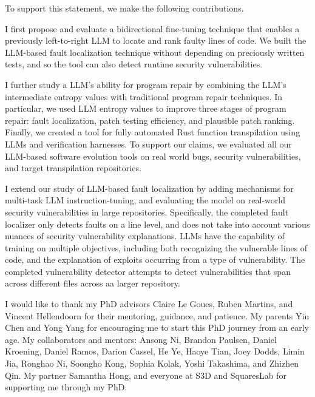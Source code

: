 \documentclass[12pt,openany,oneside,table]{cmuthesis}
\begin{document}
To support this statement, we make the following contributions. 

I first propose and evaluate a bidirectional fine-tuning technique that enables a previously left-to-right LLM to locate and rank faulty lines of code. We built the LLM-based fault localization technique without depending on preciously written tests, and so the tool can also detect runtime security vulnerabilities. 

I further study a LLM's ability for program repair by combining the LLM's intermediate entropy values with traditional program repair techniques. In particular, we used LLM entropy values to improve three stages of program repair: fault localization, patch testing efficiency, and plausible patch ranking. Finally, we created a tool for fully automated Rust function transpilation using LLMs and verification harnesses. To support our claims, we evaluated all our LLM-based software evolution tools on real world bugs, security vulnerabilities, and target transpilation repositories.

I extend our study of LLM-based fault localization by adding mechanisms for multi-task LLM instruction-tuning, and evaluating the model on real-world security vulnerabilities in large repositories. Specifically, the completed fault localizer only detects faults on a line level, and does not take into account various nuances of security vulnerability explanations. LLMs have the capability of training on multiple objectives, including both recognizing the vulnerable lines of code, and the explanation of exploits occurring from a type of vulnerability. The completed vulnerability detector attempts to detect vulnerabilities that span across different files across aa larger repository. 

\begin{acknowledgments}
    I would like to thank my PhD advisors Claire Le Goues, Ruben Martins, and Vincent Hellendoorn for their mentoring, guidance, and patience. My parents Yin Chen and Yong Yang for encouraging me to start this PhD journey from an early age. My collaborators and mentors:
    Ansong Ni, Brandon Paulsen, Daniel Kroening, Daniel Ramos, Darion Cassel, He Ye, Haoye Tian, Joey Dodds, Limin Jia, Ronghao Ni, Soongho Kong, Sophia Kolak, Yoshi Takashima, and Zhizhen Qin. My partner Samantha Hong, and everyone at S3D and SquaresLab for supporting me through my PhD.
\end{acknowledgments}

\tableofcontents
\end{document}
